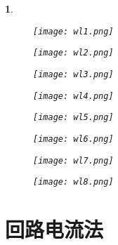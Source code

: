 \documentclass[UTF8]{report}
\theoremstyle{MyLineTheoremStyle} %
\theoremstyle{MyBlockTheoremStyle} %
\theoremstyle{MySubsubsectionStyle} %
\newtheorem{definition}{}
\begin{document}
\begin{definition}
    \begin{figure}
        \centering
        \texttt{[image: wl1.png]}
    \end{figure}

    \begin{figure}
        \centering
        \texttt{[image: wl2.png]}
    \end{figure}

    \begin{figure}
        \centering
        \texttt{[image: wl3.png]}
    \end{figure}

    \begin{figure}
        \centering
        \texttt{[image: wl4.png]}
    \end{figure}

    \begin{figure}
        \centering
        \texttt{[image: wl5.png]}
    \end{figure}

    \begin{figure}
        \centering
        \texttt{[image: wl6.png]}
    \end{figure}

    \begin{figure}
        \centering
        \texttt{[image: wl7.png]}
    \end{figure}

    \begin{figure}
        \centering
        \texttt{[image: wl8.png]}
    \end{figure}
\end{definition}

\section{回路电流法}
\end{document}
